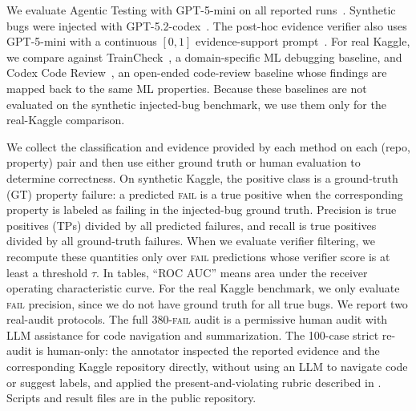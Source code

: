 \documentclass[11pt]{article}
\begin{document}
We evaluate Agentic Testing with GPT-5-mini on all reported runs~\citep{openai_models}.
Synthetic bugs were injected with GPT-5.2-codex~\citep{openai_models}.
The post-hoc evidence verifier also uses GPT-5-mini with a continuous $[0,1]$ evidence-support prompt~\citep{openai_models}.
For real Kaggle, we compare against TrainCheck~\citep{traincheck}, a domain-specific ML debugging baseline, and Codex Code Review~\citep{openai_codex}, an open-ended code-review baseline whose findings are mapped back to the same ML properties.
Because these baselines are not evaluated on the synthetic injected-bug benchmark, we use them only for the real-Kaggle comparison.

We collect the classification and evidence provided by each method on each (repo, property) pair and then use either ground truth or human evaluation to determine correctness.
On synthetic Kaggle, the positive class is a ground-truth (GT) property failure: a predicted \textsc{fail} is a true positive when the corresponding property is labeled as failing in the injected-bug ground truth.
Precision is true positives (TPs) divided by all predicted failures, and recall is true positives divided by all ground-truth failures.
When we evaluate verifier filtering, we recompute these quantities only over \textsc{fail} predictions whose verifier score is at least a threshold $\tau$.
In tables, ``ROC AUC'' means area under the receiver operating characteristic curve.
For the real Kaggle benchmark, we only evaluate \textsc{fail} precision, since we do not have ground truth for all true bugs.
We report two real-audit protocols.
The full 380-\textsc{fail} audit is a permissive human audit with LLM assistance for code navigation and summarization.
The 100-case strict re-audit is human-only: the annotator inspected the reported evidence and the corresponding Kaggle repository directly, without using an LLM to navigate code or suggest labels, and applied the present-and-violating rubric described in .
Scripts and result files are in the public repository.
\end{document}

